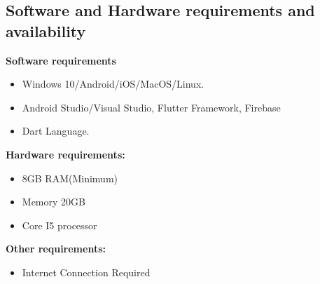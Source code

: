 \documentclass[english]{article}
\begin{document}
\subsection{Software and Hardware requirements and availability}
\hfill\break
\hspace{1cm}\normalsize\textbf{Software requirements}
\begin{itemize}
\item 	Windows 10/Android/iOS/MacOS/Linux.
\item  Android Studio/Visual Studio, Flutter Framework, Firebase
\item	Dart Language.
\end{itemize}

\hspace{-0.5cm}\normalsize\textbf{Hardware requirements:}
\begin{itemize}
\item 8GB RAM(Minimum)
\item Memory 20GB
\item Core I5 processor
\\

\end{itemize}
\hspace{-0.5cm}\normalsize\textbf{Other requirements:}
\begin{itemize}
\item  Internet Connection Required
\end{itemize}
\\

\end{document}
